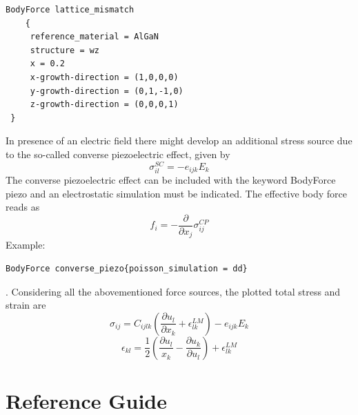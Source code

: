 \documentclass[11pt]{article} %
\begin{document}
\begin{verbatim}
BodyForce lattice_mismatch
    {
     reference_material = AlGaN
     structure = wz
     x = 0.2
     x-growth-direction = (1,0,0,0)
     y-growth-direction = (0,1,-1,0)
     z-growth-direction = (0,0,0,1)
 }
\end{verbatim}
In presence of an electric field there might develop an additional stress source due to the so-called converse piezoelectric effect, given by
\begin{equation}
 \sigma_{il}^{SC}=-e_{ijk}E_k
\end{equation}
The converse piezoelectric effect can be included with the keyword BodyForce piezo and an electrostatic simulation must be indicated. The effective body force reads as
\begin{equation}
 f_i = -\frac{\partial}{\partial x_j} \sigma_{ij}^{CP}
\end{equation}
Example: \begin{verbatim}BodyForce converse_piezo{poisson_simulation = dd} \end{verbatim}. 
Considering all the abovementioned force sources, the plotted total stress and strain are
\begin{equation}
 \sigma_{ij} = C_{ijlk}\left( \frac{\partial u_l}{\partial x_k} + \epsilon_{lk}^{LM} \right) -e_{ijk}E_k  
\end{equation}
\begin{equation}
\epsilon_{kl}=\frac{1}{2}\left(\frac{\partial u_l}{x_k}-\frac{\partial u_k}{\partial u_l} \right ) + \epsilon_{lk}^{LM}
\end{equation}

\newpage
\section{Reference Guide}
\end{document}
